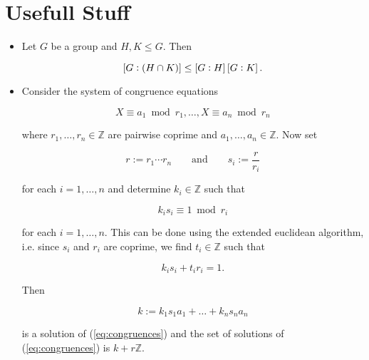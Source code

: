 \section{Usefull Stuff}
\begin{itemize}
	\item Let $G$ be a group and $H,K \leq G$. Then 

		\begin{equation}
			\sbr[0]{G:(H \cap K)} \leq \sbr[0]{G:H} \sbr[0]{G:K}.
		\end{equation}

	\item Consider the system of congruence equations

		\begin{equation}
			X \equiv a_1 \bmod r_1 , \dots , X \equiv a_n \bmod r_n
			\label{eq:congruences}
		\end{equation}

		\noindent where $r_1,\dots,r_n \in \mathbb{Z}$ are pairwise coprime and $a_1,\dots,a_n \in \mathbb{Z}$. Now set 

		\begin{equation}
			r := r_1 \cdots r_n \qquad \text{and} \qquad s_i := \frac{r}{r_i} 
		\end{equation}

		\noindent for each $i = 1,\dots,n$ and determine $k_i \in \mathbb{Z}$ such that 

		\begin{equation}
			k_is_i \equiv 1 \bmod r_i
		\end{equation}

		\noindent for each $i = 1,\dots,n$. This can be done using the extended euclidean algorithm, i.e. since $s_i$ and $r_i$ are coprime, we find $t_i \in \mathbb{Z}$ such that
		
		\begin{equation}
			k_is_i + t_ir_i = 1.
		\end{equation}
		
		Then 

		\begin{equation}
			k := k_1s_1a_1 + \dots + k_ns_na_n
		\end{equation}

		\noindent is a solution of (\ref{eq:congruences}) and the set of solutions of (\ref{eq:congruences}) is $k + r\mathbb{Z}$.
\end{itemize}
